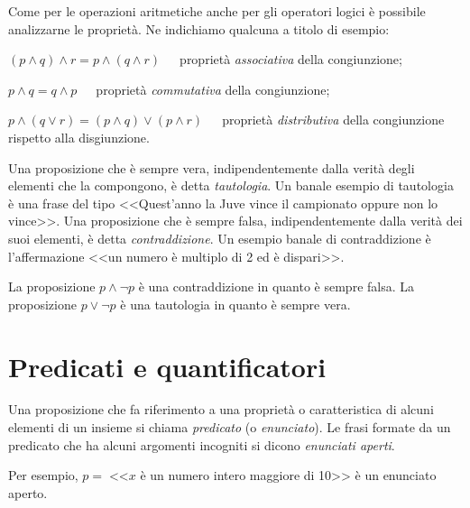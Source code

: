 Come per le operazioni aritmetiche anche per gli operatori logici è possibile analizzarne le proprietà. Ne indichiamo qualcuna a titolo di esempio:
\begin{itemize*}
\item $(p\wedge q)\wedge r = p\wedge (q\wedge r)$~~~proprietà \emph{associativa} della congiunzione;
\item $p\wedge q = q \wedge p$~~~proprietà \emph{commutativa} della congiunzione;
\item $p\wedge (q\vee r) = (p\wedge q)\vee(p\wedge r)$~~~proprietà \emph{distributiva} della congiunzione rispetto alla disgiunzione.
\end{itemize*}

Una proposizione che è sempre vera, indipendentemente dalla verità degli elementi che la compongono, è detta \emph{tautologia}. Un banale esempio di tautologia è una frase del tipo <<Quest'anno la Juve vince il campionato oppure non lo vince>>. Una proposizione che è sempre falsa, indipendentemente dalla verità dei suoi elementi, è detta \emph{contraddizione}. Un esempio banale di contraddizione è l'affermazione <<un numero è multiplo di 2 ed è dispari>>.

\begin{exrig}
\begin{esempio}
	La proposizione $p\wedge \neg p$ è una contraddizione in quanto è sempre falsa.
	La proposizione $p\vee \neg p$ è una tautologia in quanto è sempre vera.
\end{esempio}
\end{exrig}

\vspazio\ovalbox{\risolvii \ref{ese:6.2}, \ref{ese:6.3}, \ref{ese:6.4}, \ref{ese:6.5}, \ref{ese:6.6}, \ref{ese:6.7}, \ref{ese:6.8}, \ref{ese:6.9}}

\section{Predicati e quantificatori}

Una proposizione che fa riferimento a una proprietà o caratteristica di alcuni elementi di un insieme si chiama \emph{predicato} (o \emph{enunciato}). Le frasi formate da un predicato che ha alcuni argomenti incogniti si dicono \emph{enunciati aperti}.

Per esempio, $p =\;$<<$x$ è un numero intero maggiore di 10>> è un enunciato aperto.

